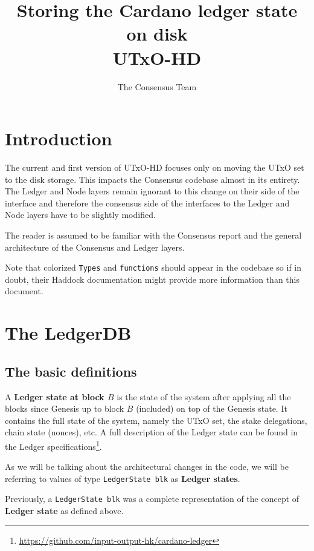 \documentclass[11pt,a4paper]{article}
\title{Storing the Cardano ledger state on disk\\
       {\large \sc UTxO-HD}}
\author{The Consensus Team}
\newcommand{\htt}[1]{\texttt{#1}}
\theoremstyle{definition}
\begin{document}
\maketitle

\tableofcontents

\section{Introduction}

The current and first version of UTxO-HD focuses only on moving the UTxO set to
the disk storage. This impacts the Consensus codebase almost in its entirety.
The Ledger and Node layers remain ignorant to this change on their side of the
interface and therefore the consensus side of the interfaces to the Ledger and
Node layers have to be slightly modified.

The reader is assumed to be familiar with the Consensus report \cite{report} and the general
architecture of the Consensus and Ledger layers.

Note that colorized \htt{Types} and \htt{functions} should appear in the
codebase so if in doubt, their Haddock documentation might provide more
information than this document.

\section{The LedgerDB}

\subsection{The basic definitions}

A \textbf{Ledger state at block $B$} is the state of the system after applying
all the blocks since Genesis up to block $B$ (included) on top of the Genesis
state. It contains the full state of the system, namely the UTxO set, the stake
delegations, chain state (nonces), etc. A full description of the Ledger state
can be found in the Ledger
specifications\footnote{\href{https://github.com/input-output-hk/cardano-ledger}{https://github.com/input-output-hk/cardano-ledger}}.

As we will be talking about the architectural changes in the code, we will be
referring to values of type \htt{LedgerState blk} as \textbf{Ledger states}.

Previously, a \htt{LedgerState blk} was a complete representation of the
concept of \textbf{Ledger state} as defined above.
\end{document}
